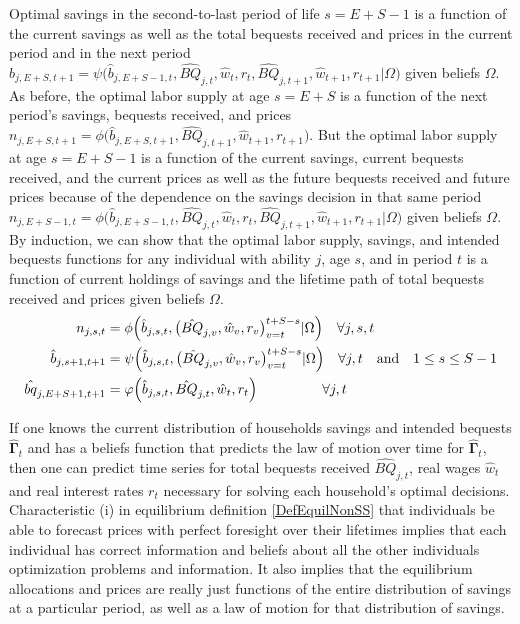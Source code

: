 \documentclass[letterpaper,12pt]{article}
\theoremstyle{definition}
\begin{document}
\begin{spacing}{1.5}
    Optimal savings in the second-to-last period of life $s=E+S-1$ is a function of the current savings as well as the total bequests received and prices in the current period and in the next period $\hat{b}_{j,E+S,t+1} = \psi\bigl(\hat{b}_{j,E+S-1,t},\hat{BQ}_{j,t},\hat{w}_t,r_t,\hat{BQ}_{j,t+1},\hat{w}_{t+1},r_{t+1}|\Omega\bigr)$ given beliefs $\Omega$. As before, the optimal labor supply at age $s=E+S$ is a function of the next period's savings, bequests received, and prices $n_{j,E+S,t+1}=\phi\bigl(\hat{b}_{j,E+S,t+1},\hat{BQ}_{j,t+1},\hat{w}_{t+1},r_{t+1}\bigr)$. But the optimal labor supply at age $s=E+S-1$ is a function of the current savings, current bequests received, and the current prices as well as the future bequests received and future prices because of the dependence on the savings decision in that same period $n_{j,E+S-1,t}=\phi\bigl(\hat{b}_{j,E+S-1,t},\hat{BQ}_{j,t},\hat{w}_t,r_t,\hat{BQ}_{j,t+1},\hat{w}_{t+1},r_{t+1}|\Omega\bigr)$ given beliefs $\Omega$. By induction, we can show that the optimal labor supply, savings, and intended bequests functions for any individual with ability $j$, age $s$, and in period $t$ is a function of current holdings of savings and the lifetime path of total bequests received and prices given beliefs $\Omega$.
    \begin{align}
      n_{j,s,t} &= \phi\Bigl(\hat{b}_{j,s,t},\bigl(\hat{BQ}_{j,v},\hat{w}_v,r_v\bigr)_{v=t}^{t+S-s}|\Omega\Bigr) \quad\forall j,s,t \label{EqLabPolFuncGen} \\
      \hat{b}_{j,s+1,t+1} &= \psi\Bigl(\hat{b}_{j,s,t},\bigl(\hat{BQ}_{j,v},\hat{w}_v,r_v\bigr)_{v=t}^{t+S-s}|\Omega\Bigr) \quad\forall j,t \quad\text{and}\quad 1\leq s\leq S-1 \label{EqSavPolFuncGen} \\
      \hat{bq}_{j,E+S+1,t+1} &= \varphi\Bigl(\hat{b}_{j,s,t},\hat{BQ}_{j,t},\hat{w}_t,r_t\Bigr) \quad\quad\quad\quad\:\:\:\forall j,t \label{EqBeqPolFuncGen}
    \end{align}

    If one knows the current distribution of households savings and intended bequests $\bm{\hat{\Gamma}}_t$ and has a beliefs function that predicts the law of motion over time for $\bm{\hat{\Gamma}}_t$, then one can predict time series for total bequests received $\hat{BQ}_{j,t}$, real wages $\hat{w}_t$ and real interest rates $r_t$ necessary for solving each household's optimal decisions. Characteristic (i) in equilibrium definition \ref{DefEquilNonSS} that individuals be able to forecast prices with perfect foresight over their lifetimes implies that each individual has correct information and beliefs about all the other individuals optimization problems and information. It also implies that the equilibrium allocations and prices are really just functions of the entire distribution of savings at a particular period, as well as a law of motion for that distribution of savings.


\end{spacing}
\end{document}

